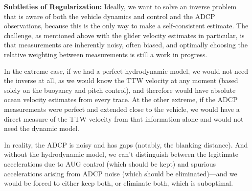 \textbf{Subtleties of Regularization:}
%
Ideally, we want to solve an inverse problem that is aware of both the
vehicle dynamics and control and the ADCP observations, because this is the
only way to make a self-consistent estimate. The challenge, as mentioned above
with the glider velocity estimates in particular, is that measurements are inherently
noisy, often biased, and optimally choosing the relative weighting between
measurements is still a work in progress.
%
%

In the extreme case, if we had a perfect hydrodynamic model, we would not need
the inverse at all, as we would know the TTW velocity at any moment (based
solely on the buoyancy and pitch control), and therefore would have absolute
ocean velocity estimates from every trace. At the other extreme, if the ADCP
measurements were perfect and extended close to the vehicle, we would have a
direct measure of the TTW velocity from that information alone and would not
need the dynamic model.

In reality, the ADCP is noisy and has gaps (notably, the blanking
distance). And without the hydrodynamic model, we can't distinguish between the legitimate accelerations due to AUG control (which
should be kept) and spurious accelerations arising from ADCP noise (which should
be eliminated)---and we would be forced to either keep both, or eliminate both,
which is suboptimal.





